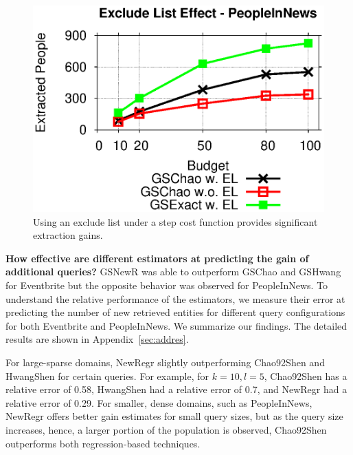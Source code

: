 \begin{figure}[t]
	\begin{center}
	\includegraphics[clip,scale=0.5]{figs/exEffect.eps}
	\caption{Using an exclude list under a step cost function provides significant extraction gains.}
	\label{fig:exEffect}
	\end{center}
\end{figure}

\noindent\textbf{How effective are different estimators at predicting the gain of additional queries?}
GSNewR was able to outperform GSChao and GSHwang for Eventbrite but the opposite behavior was observed for PeopleInNews. To understand the relative performance of the estimators, we measure their error at predicting the number of new retrieved entities for different query configurations for both Eventbrite and PeopleInNews. We summarize our findings. The detailed results are shown in Appendix~\ref{sec:addres}.

For large-sparse domains, NewRegr slightly outperforming Chao92Shen and HwangShen for certain queries. For example, for $k = 10, l = 5$, Chao92Shen has a relative error of 0.58, HwangShen had a relative error of 0.7, and NewRegr had a relative error of 0.29. For smaller, dense domains, such as PeopleInNews, NewRegr offers better gain estimates for small query sizes, but as the query size increases, hence, a larger portion of the population is observed, Chao92Shen outperforms both regression-based techniques. 





